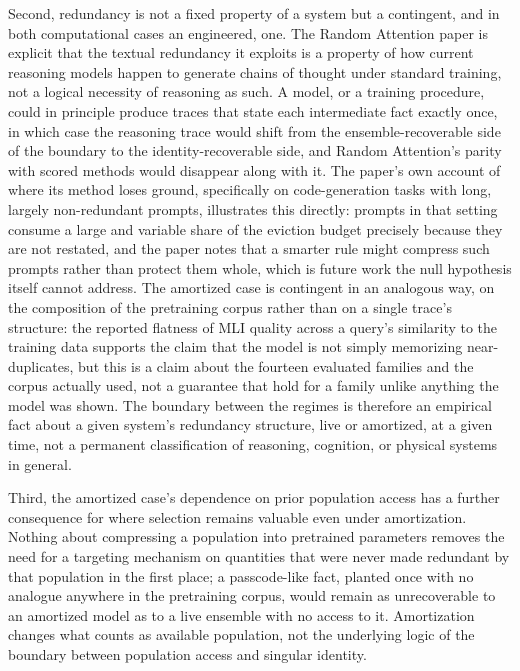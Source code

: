 \documentclass[11pt]{article}
\begin{document}
Second, redundancy is not a fixed property of a system but a contingent, and in both computational cases an engineered, one. The Random Attention paper is explicit that the textual redundancy it exploits is a property of how current reasoning models happen to generate chains of thought under standard training, not a logical necessity of reasoning as such. A model, or a training procedure, could in principle produce traces that state each intermediate fact exactly once, in which case the reasoning trace would shift from the ensemble-recoverable side of the boundary to the identity-recoverable side, and Random Attention's parity with scored methods would disappear along with it. The paper's own account of where its method loses ground, specifically on code-generation tasks with long, largely non-redundant prompts, illustrates this directly: prompts in that setting consume a large and variable share of the eviction budget precisely because they are not restated, and the paper notes that a smarter rule might compress such prompts rather than protect them whole, which is future work the null hypothesis itself cannot address. The amortized case is contingent in an analogous way, on the composition of the pretraining corpus rather than on a single trace's structure: the reported flatness of MLI quality across a query's similarity to the training data supports the claim that the model is not simply memorizing near-duplicates, but this is a claim about the fourteen evaluated families and the corpus actually used, not a guarantee that hold for a family unlike anything the model was shown. The boundary between the regimes is therefore an empirical fact about a given system's redundancy structure, live or amortized, at a given time, not a permanent classification of reasoning, cognition, or physical systems in general.

Third, the amortized case's dependence on prior population access has a further consequence for where selection remains valuable even under amortization. Nothing about compressing a population into pretrained parameters removes the need for a targeting mechanism on quantities that were never made redundant by that population in the first place; a passcode-like fact, planted once with no analogue anywhere in the pretraining corpus, would remain as unrecoverable to an amortized model as to a live ensemble with no access to it. Amortization changes what counts as available population, not the underlying logic of the boundary between population access and singular identity.
\end{document}
